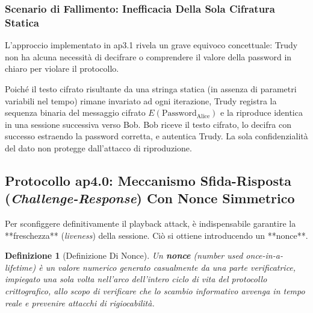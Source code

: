 \documentclass[11pt, a4paper]{article}
\newtheorem{theorem}{Definizione}
\begin{document}
\subsubsection{Scenario di Fallimento: Inefficacia Della Sola Cifratura Statica}
L'approccio implementato in ap3.1 rivela un grave equivoco concettuale: Trudy non ha alcuna necessità di decifrare o comprendere il valore della password in chiaro per violare il protocollo.


Poiché il testo cifrato risultante da una stringa statica (in assenza di parametri variabili nel tempo) rimane invariato ad ogni iterazione, Trudy registra la sequenza binaria del messaggio cifrato $E(\text{Password}_{\text{Alice}})$ e la riproduce identica in una sessione successiva verso Bob. Bob riceve il testo cifrato, lo decifra con successo estraendo la password corretta, e autentica Trudy. La sola confidenzialità del dato non protegge dall'attacco di riproduzione.

\subsection{Protocollo ap4.0: Meccanismo Sfida-Risposta (\emph{Challenge-Response}) Con Nonce Simmetrico}

Per sconfiggere definitivamente il playback attack, è indispensabile garantire la **freschezza** (\emph{liveness}) della sessione. Ciò si ottiene introducendo un **nonce**.

\begin{theorem}[Definizione Di Nonce]
Un \textbf{nonce} (\emph{number used once-in-a-lifetime}) è un valore numerico generato casualmente da una parte verificatrice, impiegato una sola volta nell'arco dell'intero ciclo di vita del protocollo crittografico, allo scopo di verificare che lo scambio informativo avvenga in tempo reale e prevenire attacchi di rigiocabilità.
\end{theorem}

\end{document}

